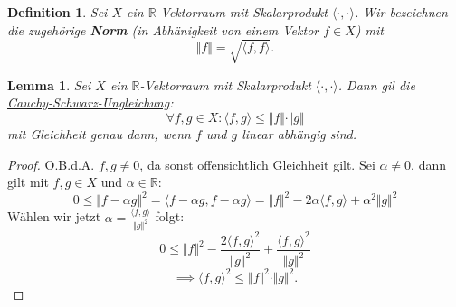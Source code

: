 \documentclass{book}
\newtheorem{lemma}[algorithm]{Lemma}
\newtheorem{definition}[algorithm]{Definition}
\def\R{\mathbb{R}}
\begin{document}
            \begin{definition}\label{d1.3}
                Sei $X$ ein $\R$-Vektorraum mit Skalarprodukt $\langle \cdot,\cdot \rangle$.
                Wir bezeichnen die zugehörige \textbf{Norm} (in Abhänigkeit von einem Vektor $f\in X$) mit 
                \begin{equation*}
                    \Vert f \Vert =\sqrt{\langle f,f\rangle}.
                \end{equation*}
            \end{definition}

            \begin{lemma}\label{l1.4}
                Sei $X$ ein $\R$-Vektorraum mit Skalarprodukt $\langle \cdot,\cdot \rangle$. Dann gil die \underline{Cauchy-Schwarz-Ungleichung}:
                \begin{equation}
                    \tag{C.S.}
                    \forall f,g\in X:\langle f,g \rangle\leq \Vert f\Vert \cdot\Vert g \Vert
                \end{equation}
                mit Gleichheit genau dann, wenn $f$ und $g$ linear abhängig sind.
            \end{lemma}
            \begin{proof}
                O.B.d.A. $f,g\neq 0$, da sonst offensichtlich Gleichheit gilt.
                Sei $\alpha\neq 0$, dann gilt mit $f,g\in X$ und $\alpha \in \R$:
                \begin{equation*}
                    0\leq \Vert f -\alpha g\Vert^2= \langle f-\alpha g,f-\alpha g \rangle
                    = \Vert f \Vert^2 -2\alpha \langle f,g \rangle+\alpha^2 \Vert g \Vert^2
                \end{equation*}
                Wählen wir jetzt $\alpha=\frac{\langle f,g \rangle}{\Vert g \Vert^2}$ folgt:
                \begin{equation*}
                    0\leq \Vert f \Vert^2-\frac{2 \langle f,g \rangle^2}{\Vert g \Vert^2}+\frac{\langle f,g \rangle^2}{\Vert g \Vert^2}
                \end{equation*}
                \begin{equation*}
                    \implies \langle f,g \rangle^2\leq \Vert f \Vert^2\cdot \Vert g \Vert^2.
                \end{equation*}
            \end{proof}
\end{document}
